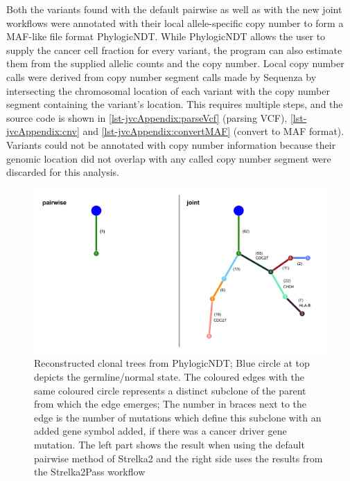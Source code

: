 Both the variants found with the default pairwise as well as with the new joint workflows were annotated with their local allele-specific copy number to form a MAF-like file format  PhylogicNDT. While PhylogicNDT allows the user to supply the cancer cell fraction for every variant, the program can also estimate them from the supplied allelic counts and the copy number. Local copy number calls were derived from copy number segment calls made by Sequenza by intersecting the chromosomal location of each variant with the copy number segment containing the variant's location. This  requires multiple steps, and the source code is shown in \autoref{lst-jvcAppendix:parseVcf} (parsing VCF), \autoref{lst-jvcAppendix:cnv} and \autoref{lst-jvcAppendix:convertMAF} (convert to MAF format). Variants  could not be annotated with copy number information because their genomic location did not overlap with any called copy number segment were discarded for this analysis.

\begin{figure}[ht]
\centering
\includegraphics[width=.99\linewidth]{Figures/jointVariantCalling/clonalDeconv.pdf}
\caption[Reconstructed clonal trees for joint and pairwise variant calling]{Reconstructed clonal trees from PhylogicNDT; Blue circle at top depicts the germline/normal state. The coloured edges with the same coloured circle represents a distinct subclone of the parent from which the edge emerges; The number in braces next to the edge is the number of mutations which define this subclone with an added gene symbol added, if there was a cancer driver gene mutation. The left part shows the result when using the default pairwise method of Strelka2 and the right side uses the results from the Strelka2Pass workflow}\label{fig:clonaldeconv}
\end{figure}


